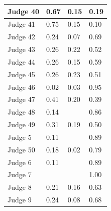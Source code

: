 \documentclass[11pt]{article}
\begin{document}
\begin{table}[H]
\begin{tabular}{|l|l|l|l|}
      Judge 40         & 0.67            & 0.15             & 0.19                 \\ \hline
      Judge 41         & 0.75            & 0.15             & 0.10                 \\ \hline
      Judge 42         & 0.24            & 0.07             & 0.69                 \\ \hline
      Judge 43         & 0.26            & 0.22             & 0.52                 \\ \hline
      Judge 44         & 0.26            & 0.15             & 0.59                 \\ \hline
      Judge 45         & 0.26            & 0.23             & 0.51                 \\ \hline
      Judge 46         & 0.02            & 0.03             & 0.95                 \\ \hline
      Judge 47         & 0.41            & 0.20             & 0.39                 \\ \hline
      Judge 48         & 0.14            &                  & 0.86                 \\ \hline
      Judge 49         & 0.31            & 0.19             & 0.50                 \\ \hline
      Judge 5          & 0.11            &                  & 0.89                 \\ \hline
      Judge 50         & 0.18            & 0.02             & 0.79                 \\ \hline
      Judge 6          & 0.11            &                  & 0.89                 \\ \hline
      Judge 7          &                 &                  & 1.00                 \\ \hline
      Judge 8          & 0.21            & 0.16             & 0.63                 \\ \hline
      Judge 9          & 0.24            & 0.08             & 0.68                 \\ \hline
      \end{tabular}
    \end{table}
\end{document}

